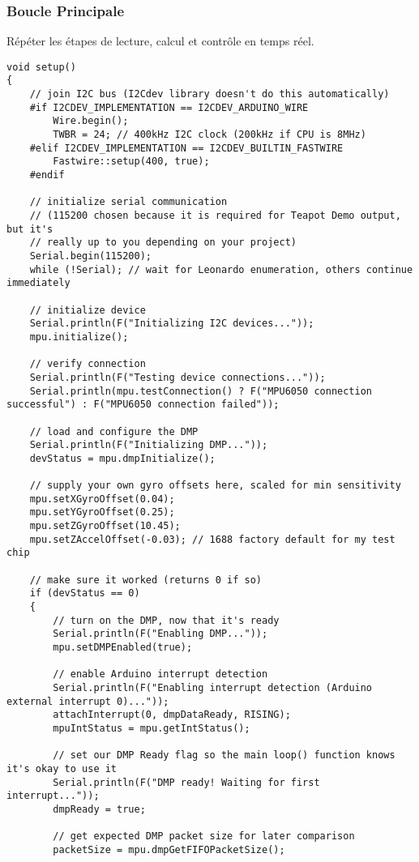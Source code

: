 \documentclass{report}
\begin{document}
\subsubsection{Boucle Principale}
Répéter les étapes de lecture, calcul et contrôle en temps réel.
\begin{verbatim}
void setup()
{
    // join I2C bus (I2Cdev library doesn't do this automatically)
    #if I2CDEV_IMPLEMENTATION == I2CDEV_ARDUINO_WIRE
        Wire.begin();
        TWBR = 24; // 400kHz I2C clock (200kHz if CPU is 8MHz)
    #elif I2CDEV_IMPLEMENTATION == I2CDEV_BUILTIN_FASTWIRE
        Fastwire::setup(400, true);
    #endif

    // initialize serial communication
    // (115200 chosen because it is required for Teapot Demo output, but it's
    // really up to you depending on your project)
    Serial.begin(115200);
    while (!Serial); // wait for Leonardo enumeration, others continue immediately

    // initialize device
    Serial.println(F("Initializing I2C devices..."));
    mpu.initialize();

    // verify connection
    Serial.println(F("Testing device connections..."));
    Serial.println(mpu.testConnection() ? F("MPU6050 connection successful") : F("MPU6050 connection failed"));

    // load and configure the DMP
    Serial.println(F("Initializing DMP..."));
    devStatus = mpu.dmpInitialize();

    // supply your own gyro offsets here, scaled for min sensitivity
    mpu.setXGyroOffset(0.04);
    mpu.setYGyroOffset(0.25);
    mpu.setZGyroOffset(10.45);
    mpu.setZAccelOffset(-0.03); // 1688 factory default for my test chip

    // make sure it worked (returns 0 if so)
    if (devStatus == 0)
    {
        // turn on the DMP, now that it's ready
        Serial.println(F("Enabling DMP..."));
        mpu.setDMPEnabled(true);

        // enable Arduino interrupt detection
        Serial.println(F("Enabling interrupt detection (Arduino external interrupt 0)..."));
        attachInterrupt(0, dmpDataReady, RISING);
        mpuIntStatus = mpu.getIntStatus();

        // set our DMP Ready flag so the main loop() function knows it's okay to use it
        Serial.println(F("DMP ready! Waiting for first interrupt..."));
        dmpReady = true;

        // get expected DMP packet size for later comparison
        packetSize = mpu.dmpGetFIFOPacketSize();
        

\end{verbatim}
\end{document}

